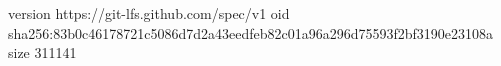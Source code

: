 version https://git-lfs.github.com/spec/v1
oid sha256:83b0c46178721c5086d7d2a43eedfeb82c01a96a296d75593f2bf3190e23108a
size 311141
